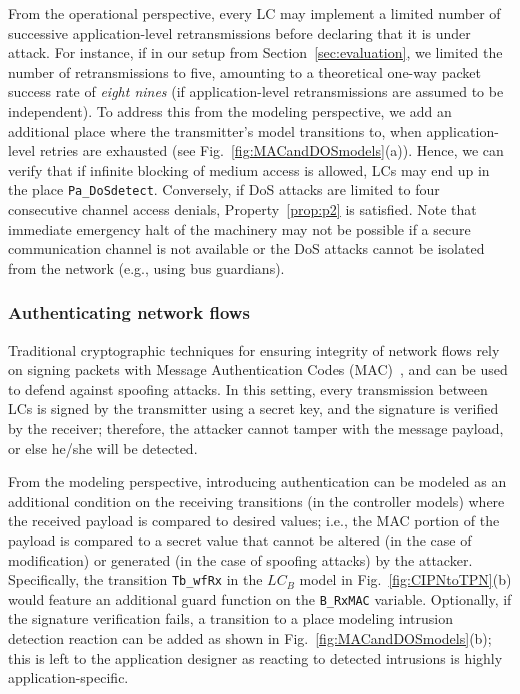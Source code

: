 From the operational perspective, every LC may implement a limited number of successive application-level retransmissions before declaring that it is under attack. For instance, if in our setup from Section~\ref{sec:evaluation}, we limited the number of retransmissions to five, amounting to a theoretical one-way packet success rate of \emph{eight nines} (if application-level retransmissions are assumed to be independent). To address this from the modeling perspective, we add an additional place where the transmitter's model transitions to, when application-level retries are exhausted (see Fig.~\ref{fig:MACandDOSmodels}(a)). Hence, we can verify that if infinite blocking of medium access is allowed, LCs may end up in the place \verb!Pa_DoSdetect!. Conversely, if DoS attacks are limited to four consecutive channel access denials, Property~\ref{prop:p2} is satisfied. Note that immediate emergency halt of the machinery may not be possible if a secure communication channel is not available or the DoS attacks cannot be isolated from the network (e.g., using bus guardians).


\subsubsection{Authenticating network flows}
\label{subsubsec:authentication}
Traditional cryptographic techniques for ensuring integrity of network flows rely on signing packets with Message Authentication Codes (MAC)~\cite{802.15.4auth}, and can be used to defend against spoofing attacks. In this setting, every transmission between LCs is signed by the transmitter using a secret key, and the signature is verified by the receiver; therefore, the attacker cannot tamper with the message payload, or else he/she will be detected.

From the modeling perspective, introducing authentication can be modeled as an additional condition on the receiving transitions (in the controller models) where the received payload is compared to desired values; i.e., the MAC portion of the payload is compared to a secret value that cannot be altered (in the case of modification) or generated (in the case of spoofing attacks) by the attacker. Specifically, the transition \verb!Tb_wfRx! in the $LC_B$ model in Fig.~\ref{fig:CIPNtoTPN}(b) would feature an additional guard function on the \verb!B_RxMAC! variable. Optionally, if the signature verification fails, a transition to a place modeling intrusion detection reaction can be added as shown in Fig.~\ref{fig:MACandDOSmodels}(b); this is left to the application designer as reacting to detected intrusions is highly application-specific.

